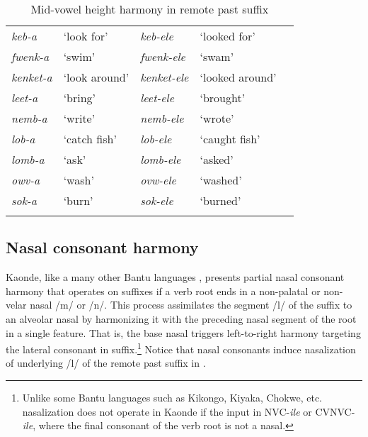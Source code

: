 \documentclass[output=paper]{langsci/langscibook}
\begin{document}
\begin{table}
\begin{tabular}{lllll}
\lsptoprule
\textit{keb-a}   & ‘look for’    & \textit{keb-ele}    & ‘looked for’    &  \\
\textit{fwenk-a} & ‘swim’    & \textit{fwenk-ele}  & ‘swam’  &  \\
\textit{kenket-a}    & ‘look around’ & \textit{kenket-ele} & ‘looked around’ &  \\
\textit{leet-a}  & ‘bring’   & \textit{leet-ele}   & ‘brought’   &  \\
\textit{nemb-a}  & ‘write’   & \textit{nemb-ele}   & ‘wrote’ &  \\
\textit{lob-a}   & ‘catch fish’  & \textit{lob-ele}    & ‘caught fish’   &  \\
\textit{lomb-a}  & ‘ask’ & \textit{lomb-ele}   & ‘asked’ &  \\
\textit{owv-a}   & ‘wash’    & \textit{ovw-ele}    & ‘washed’    &  \\
\textit{sok-a}   & ‘burn’    & \textit{sok-ele}    & ‘burned’    & \\
\lspbottomrule
\end{tabular}

\caption{ Mid-vowel height harmony in remote past suffix}
\label{tab:3.kawasha}

 \end{table}




\subsection{Nasal consonant harmony}

 
Kaonde, like a many other Bantu languages \citep{greenberg1951}, presents partial nasal consonant harmony that operates on suffixes if a verb root ends in a non-palatal or non-velar nasal /m/ or /n/. This process assimilates the segment /l/ of the suffix to an alveolar nasal by harmonizing it with the preceding nasal segment of the root in a single feature. That is, the base nasal triggers left-to-right harmony targeting the lateral consonant in suffix.\footnote{Unlike some Bantu languages such as Kikongo, Kiyaka, Chokwe, etc. nasalization does not operate in Kaonde if the input in NVC-\textit{ile} or CVNVC-\textit{ile}, where the final consonant of the verb root is not a nasal.} Notice that nasal consonants induce nasalization of underlying /l/ of the remote past suffix in . 
 
\end{document}
